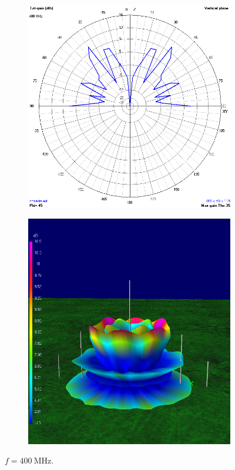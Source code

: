 \begin{figure}[H]
	\begin{subfigure}{0.5\textwidth}
		\includegraphics[scale=0.43]{imagenes/2D_400MHz_tierra.png}
	\end{subfigure}	
	\quad
	\begin{subfigure}{0.5\textwidth}
		\includegraphics[scale=0.43]{imagenes/3D_400MHz_tierra.png}
	\end{subfigure}
	\caption{$f=\SI{400}{\mega\hertz}$.}
	\label{fig.radiacion_400M_tierra}
\end{figure}

